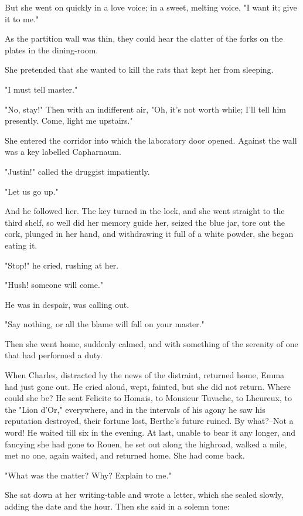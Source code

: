 \documentclass[11pt,twocolumn]{ltugboat}
\begin{document}
But she went on quickly in a love voice; in a sweet, melting voice, "I
want it; give it to me."

As the partition wall was thin, they could hear the clatter of the forks
on the plates in the dining-room.

She pretended that she wanted to kill the rats that kept her from
sleeping.

"I must tell master."

"No, stay!" Then with an indifferent air, "Oh, it's not worth while;
I'll tell him presently. Come, light me upstairs."

She entered the corridor into which the laboratory door opened. Against
the wall was a key labelled Capharnaum.

"Justin!" called the druggist impatiently.

"Let us go up."

And he followed her. The key turned in the lock, and she went straight
to the third shelf, so well did her memory guide her, seized the blue
jar, tore out the cork, plunged in her hand, and withdrawing it full of
a white powder, she began eating it.

"Stop!" he cried, rushing at her.

"Hush! someone will come."

He was in despair, was calling out.

"Say nothing, or all the blame will fall on your master."

Then she went home, suddenly calmed, and with something of the serenity
of one that had performed a duty.

When Charles, distracted by the news of the distraint, returned home,
Emma had just gone out. He cried aloud, wept, fainted, but she did not
return. Where could she be? He sent Felicite to Homais, to Monsieur
Tuvache, to Lheureux, to the "Lion d'Or," everywhere, and in the
intervals of his agony he saw his reputation destroyed, their fortune
lost, Berthe's future ruined. By what?--Not a word! He waited till six
in the evening. At last, unable to bear it any longer, and fancying she
had gone to Rouen, he set out along the highroad, walked a mile, met no
one, again waited, and returned home. She had come back.

"What was the matter? Why? Explain to me."

She sat down at her writing-table and wrote a letter, which she sealed
slowly, adding the date and the hour. Then she said in a solemn tone:
\end{document}
